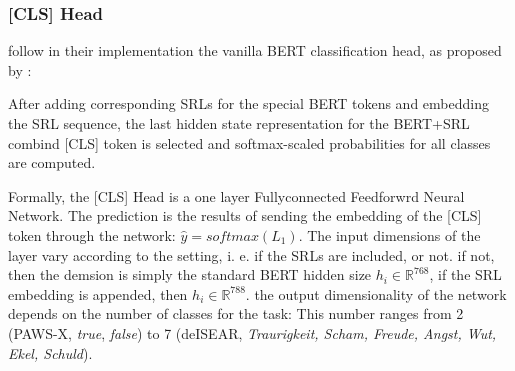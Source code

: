\subsubsection{[CLS] Head}

\cite{zhang2019semantics} follow in their implementation the vanilla BERT classification
head, as proposed by \cite{devlin2018bert}:

After adding corresponding SRLs for the special BERT tokens and embedding the SRL sequence,
the last hidden state representation for the BERT+SRL combind [CLS] token is selected
and softmax-scaled probabilities for all classes are computed.



Formally, the [CLS] Head is a one layer Fullyconnected Feedforwrd Neural Network. The
prediction is the results of sending the embedding of the [CLS] token through the network:
$\hat{y} = softmax(L_1)$. The input dimensions of the layer vary according to the setting,
i. e. if the SRLs are included, or not. if not, then the demsion is simply the standard
BERT hidden size $h_i \in \mathbb{R}^{768}$, if the SRL embedding is appended, then $h_i \in
\mathbb{R}^{788}$. the output dimensionality of the network depends on the number of classes
for the task: This number ranges from 2 (PAWS-X, \emph{true}, \emph{false}) to 7 (deISEAR,
\emph{Traurigkeit, Scham, Freude, Angst, Wut, Ekel, Schuld}).



